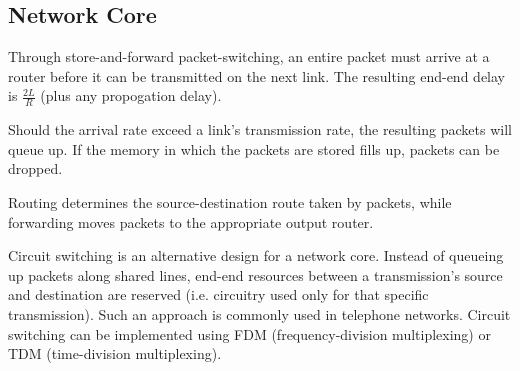 \documentclass[12pt,titlepage]{article}
\begin{document}
    \subsection{Network Core}
    Through store-and-forward packet-switching, an entire packet must arrive at a router before it can be transmitted on the next link. The
    resulting end-end delay is $\frac{2L}{R}$ (plus any propogation delay).

    Should the arrival rate exceed a link's transmission rate, the resulting packets will queue up. If the memory in which the packets are
    stored fills up, packets can be dropped.

    Routing determines the source-destination route taken by packets, while forwarding moves packets to the appropriate output router.

    Circuit switching is an alternative design for a network core. Instead of queueing up packets along shared lines, end-end resources
    between a transmission's source and destination are reserved (i.e. circuitry used only for that specific transmission). Such an approach
    is commonly used in telephone networks. Circuit switching can be implemented using FDM (frequency-division multiplexing) or TDM
    (time-division multiplexing).
\end{document}
